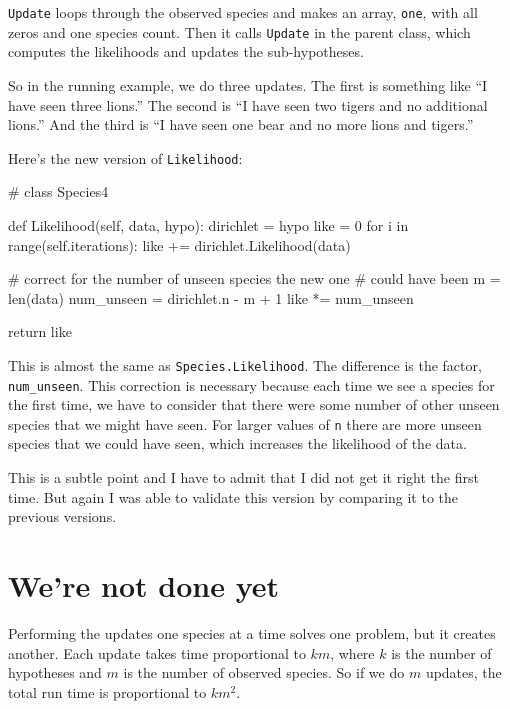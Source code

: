 \documentclass[12pt]{book}
\theoremstyle{exercise}
\begin{document}
{\tt Update} loops through the observed species and makes an
array, {\tt one}, with all zeros and one species count.  Then
it calls {\tt Update} in the parent class, which computes
the likelihoods and updates the sub-hypotheses.

So in the running example, we do three updates.  The first
is something like ``I have seen three lions.''  The second is
``I have seen two tigers and no additional lions.''  And the third
is ``I have seen one bear and no more lions and tigers.''

Here's the new version of {\tt Likelihood}:

\begin{code}
# class Species4

    def Likelihood(self, data, hypo):
        dirichlet = hypo
        like = 0
        for i in range(self.iterations):
            like += dirichlet.Likelihood(data)

        # correct for the number of unseen species the new one
        # could have been
        m = len(data)
        num_unseen = dirichlet.n - m + 1
        like *= num_unseen

        return like
\end{code}

This is almost the same as {\tt Species.Likelihood}.  The difference
is the factor, \verb"num_unseen".  This correction is necessary
because each time we see a species for the first time, we have to
consider that there were some number of other unseen species that
we might have seen.  For larger values of {\tt n} there are more
unseen species that we could have seen, which increases the likelihood
of the data.

This is a subtle point and I have to admit that I did not get it right
the first time.  But again I was able to validate this version
by comparing it to the previous versions.


\section{We're not done yet}

\newcommand{\BigO}[1]{\mathcal{O}(#1)}

Performing the updates one species at a time solves one problem, but
it creates another.  Each update takes time proportional to $k m$,
where $k$ is the number of hypotheses and $m$ is the number of observed
species.  So if we do $m$ updates, the total run time is
proportional to $k m^2$. 
\end{document}

